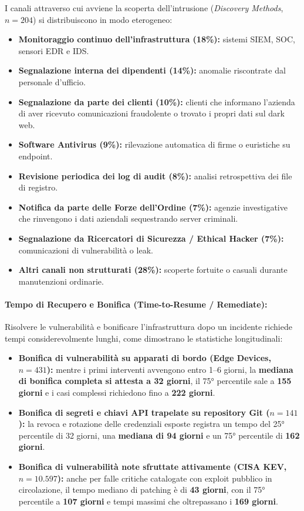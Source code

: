 \documentclass[../../main.tex]{subfiles}
\begin{document}
I canali attraverso cui avviene la scoperta dell'intrusione (\textit{Discovery Methods}, $n=204$) si distribuiscono in modo eterogeneo:
\begin{itemize}
    \item \textbf{Monitoraggio continuo dell'infrastruttura (18\%):} sistemi SIEM, SOC, sensori EDR e IDS.
    \item \textbf{Segnalazione interna dei dipendenti (14\%):} anomalie riscontrate dal personale d'ufficio.
    \item \textbf{Segnalazione da parte dei clienti (10\%):} clienti che informano l'azienda di aver ricevuto comunicazioni fraudolente o trovato i propri dati sul dark web.
    \item \textbf{Software Antivirus (9\%):} rilevazione automatica di firme o euristiche su endpoint.
    \item \textbf{Revisione periodica dei log di audit (8\%):} analisi retrospettiva dei file di registro.
    \item \textbf{Notifica da parte delle Forze dell'Ordine (7\%):} agenzie investigative che rinvengono i dati aziendali sequestrando server criminali.
    \item \textbf{Segnalazione da Ricercatori di Sicurezza / Ethical Hacker (7\%):} comunicazioni di vulnerabilità o leak.
    \item \textbf{Altri canali non strutturati (28\%):} scoperte fortuite o casuali durante manutenzioni ordinarie.
\end{itemize}

\paragraph{Tempo di Recupero e Bonifica (Time-to-Resume / Remediate):}
Risolvere le vulnerabilità e bonificare l'infrastruttura dopo un incidente richiede tempi considerevolmente lunghi, come dimostrano le statistiche longitudinali:
\begin{itemize}
    \item \textbf{Bonifica di vulnerabilità su apparati di bordo (Edge Devices, $n=431$):} mentre i primi interventi avvengono entro 1--6 giorni, la \textbf{mediana di bonifica completa si attesta a 32 giorni}, il 75° percentile sale a \textbf{155 giorni} e i casi complessi richiedono fino a \textbf{222 giorni}.
    \item \textbf{Bonifica di segreti e chiavi API trapelate su repository Git ($n=141$):} la revoca e rotazione delle credenziali esposte registra un tempo del 25° percentile di 32 giorni, una \textbf{mediana di 94 giorni} e un 75° percentile di \textbf{162 giorni}.
    \item \textbf{Bonifica di vulnerabilità note sfruttate attivamente (CISA KEV, $n=10.597$):} anche per falle critiche catalogate con exploit pubblico in circolazione, il tempo mediano di patching è di \textbf{43 giorni}, con il 75° percentile a \textbf{107 giorni} e tempi massimi che oltrepassano i \textbf{169 giorni}.
\end{itemize}
\end{document}

